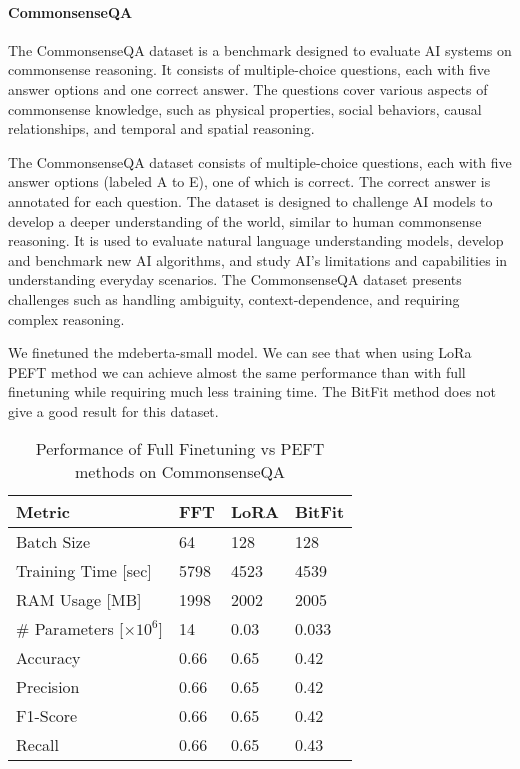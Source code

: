 \paragraph{CommonsenseQA} The CommonsenseQA dataset is a benchmark designed to evaluate AI systems on commonsense reasoning. It consists of multiple-choice questions, each with five answer options and one correct answer. The questions cover various aspects of commonsense knowledge, such as physical properties, social behaviors, causal relationships, and temporal and spatial reasoning.

The CommonsenseQA dataset consists of multiple-choice questions, each with five answer options (labeled A to E), one of which is correct. The correct answer is annotated for each question. The dataset is designed to challenge AI models to develop a deeper understanding of the world, similar to human commonsense reasoning. It is used to evaluate natural language understanding models, develop and benchmark new AI algorithms, and study AI's limitations and capabilities in understanding everyday scenarios. The CommonsenseQA dataset presents challenges such as handling ambiguity, context-dependence, and requiring complex reasoning.

We finetuned the mdeberta-small model. We can see that when using LoRa PEFT method we can achieve almost the same performance than with full finetuning while requiring much less training time. The BitFit method does not give a good result for this dataset.

\begin{table}[htbp]
  \centering
  \begin{tabularx}{\columnwidth}{@{} l *{3}{X} @{}}
    \toprule
    \textbf{Metric} & \textbf{FFT} & \textbf{LoRA} & \textbf{BitFit} \\
    \midrule
    Batch Size & 64 & 128 & 128 \\
    Training Time [sec] & 5798 & 4523 & 4539 \\
    RAM Usage [MB] & 1998 & 2002 & 2005 \\
    \# Parameters [$\times 10^6$] & 14 & 0.03 & 0.033 \\
    Accuracy & 0.66 & 0.65 & 0.42 \\
    Precision & 0.66 & 0.65 & 0.42 \\
    F1-Score & 0.66 & 0.65 & 0.42 \\
    Recall & 0.66 & 0.65 & 0.43 \\
    \bottomrule
  \end{tabularx}
  \caption{Performance of Full Finetuning vs PEFT methods on CommonsenseQA}
  \label{tab:comparison}
\end{table}

